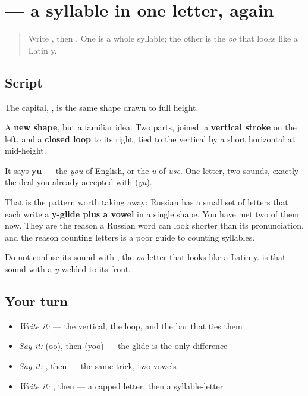 \section[\texorpdfstring{\ru{ю} (yu)}{ю (yu)}]{ — a syllable in one letter, again}

\label{lesson:RU-W07-yu}



\begin{quote}
Write , then . One is a whole syllable; the other is the \emph{oo} that looks like a Latin y.
\end{quote}

\subsection*{Script}

\begin{quote}
   
\end{quote}

The capital, \textbf{}, is the same shape drawn to full height.

A \textbf{new shape}, but a familiar idea. Two parts, joined: a \textbf{vertical stroke} on the left, and a \textbf{closed loop} to its right, tied to the vertical by a short horizontal at mid-height.

It says \textbf{yu} — the \emph{you} of English, or the \emph{u} of \emph{use}. One letter, two sounds, exactly the deal you already accepted with \textbf{} (\emph{ya}).

That is the pattern worth taking away: Russian has a small set of letters that each write a \textbf{y-glide plus a vowel} in a single shape. You have met two of them now. They are the reason a Russian word can look shorter than its pronunciation, and the reason counting letters is a poor guide to counting syllables.

Do not confuse its sound with \textbf{}, the \emph{oo} letter that looks like a Latin y.  is that sound with a \emph{y} welded to its front.

\subsection*{Your turn}
\begin{itemize}
\raggedright
  \item \emph{Write it:}  — the vertical, the loop, and the bar that ties them
  \item \emph{Say it:} \textbf{} (oo), then \textbf{} (yoo) — the glide is the only difference
  \item \emph{Say it:} \textbf{}, then \textbf{} — the same trick, two vowels
  \item \emph{Write it:} , then  — a capped letter, then a syllable-letter
\end{itemize}

